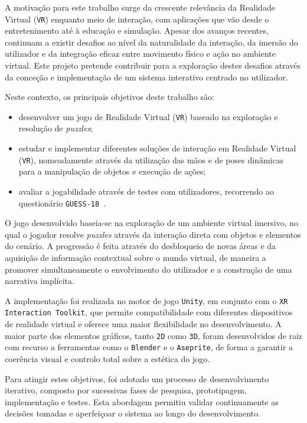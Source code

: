 \documentclass[a4paper, 12pt]{book}
\begin{document}
\par
A motivação para este trabalho surge da crescente relevância da Realidade Virtual (\texttt{VR}) 
enquanto meio de interação, com aplicações que vão desde o entretenimento até à educação e simulação. 
Apesar dos avanços recentes, continuam a existir desafios ao nível da naturalidade da interação,
 da imersão do utilizador e da integração eficaz entre movimento físico e ação no ambiente virtual. 
 Este projeto pretende contribuir para a exploração destes desafios através da conceção e implementação 
 de um sistema interativo centrado no utilizador.

\par
Neste contexto, os principais objetivos deste trabalho são:
\begin{itemize}
\item desenvolver um jogo de Realidade Virtual (\texttt{VR}) baseado na exploração e resolução de \textit{puzzles};
\item estudar e implementar diferentes soluções de interação em Realidade Virtual (\texttt{VR}), nomeadamente através 
da utilização das mãos e de poses dinâmicas para a manipulação de objetos e execução de ações;
\item avaliar a jogabilidade através de testes com utilizadores, recorrendo ao questionário \texttt{GUESS-18}~\cite{guess18}.
\end{itemize}

\par
O jogo desenvolvido baseia-se na exploração de um ambiente virtual imersivo, no qual o jogador 
resolve \textit{puzzles} através da interação direta com objetos e elementos do cenário. 
A progressão é feita através do desbloqueio de novas áreas e da aquisição de informação contextual 
sobre o mundo virtual, de maneira a promover simultaneamente o envolvimento do utilizador e a 
construção de uma narrativa implícita.

\par
A implementação foi realizada no motor de jogo \texttt{Unity}, em conjunto com o \texttt{XR Interaction Toolkit}, que permite compatibilidade com diferentes dispositivos de realidade 
virtual e oferece uma maior flexibilidade no desenvolvimento. A maior parte dos elementos gráficos, 
tanto \texttt{2D} como \texttt{3D}, foram desenvolvidos de raiz com recurso a ferramentas 
como o \texttt{Blender} e o \texttt{Aseprite}, de forma a garantir a coerência visual e 
controlo total sobre a estética do jogo.

\par
Para atingir estes objetivos, foi adotado um processo de desenvolvimento iterativo, 
composto por sucessivas fases de pesquisa, prototipagem, implementação e testes. Esta abordagem 
permitiu validar continuamente as decisões tomadas e aperfeiçoar o sistema ao longo do desenvolvimento.
\end{document}
